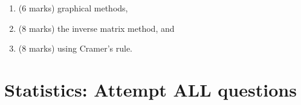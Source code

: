 \documentclass[a4paper,12pt]{article}
\begin{document}
\begin{enumerate}
\begin{enumerate}
\begin{enumerate}
\item (6 marks) graphical methods,

\item (8 marks) the inverse matrix method, and

\item (8 marks) using Cramer's rule.
\end{enumerate}
\end{enumerate}
\end{enumerate}

\newpage

\section{Statistics: Attempt ALL questions}
\end{document}
